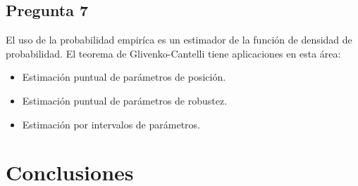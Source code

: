 \documentclass[letter,10pt]{article}
\begin{document}
 

\newpage
\subsection{Pregunta 7}
El uso de la probabilidad empiríca es un estimador de la función de densidad de probabilidad. El teorema de Glivenko-Cantelli tiene aplicaciones
en esta área:
\begin{itemize}
    \item Estimación puntual de parámetros de posición.
    \item Estimación puntual de parámetros de robustez.
    \item Estimación por intervalos de parámetros. 

\end{itemize}




\section{Conclusiones}




%
%

\end{document}
